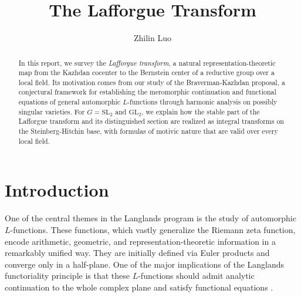 \documentclass[iccmp]{ipbook}
\title[
The Lafforgue Transform]{The Lafforgue Transform}
\author{Zhilin Luo}
\newcommand{\GL}{{\mathrm{GL}}}
\newcommand{\SL}{{\mathrm{SL}}}
\begin{document}
\begin{abstract}
In this report, we survey the \emph{Lafforgue transform}, a natural representation-theoretic map from the Kazhdan cocenter to the Bernstein center of a reductive group over a local field. Its motivation comes from our study of the Braverman-Kazhdan proposal, a conjectural framework for establishing the meromorphic continuation and functional equations of general automorphic $L$-functions through harmonic analysis on possibly singular varieties. For $G=\SL_2$ and $\GL_2$, we explain how the stable part of the Lafforgue transform and its distinguished section are realized as integral transforms on the Steinberg-Hitchin base, with formulas of motivic nature that are valid over every local field.
\end{abstract}

\maketitle


\tableofcontents


\section*{Introduction}\label{sec:intro}

One of the central themes in the Langlands program is the study of automorphic 
$L$-functions. These functions, which vastly generalize the Riemann zeta function,
encode arithmetic, geometric, and representation-theoretic information in a 
remarkably unified way. They are initially defined via Euler products and converge
only in a half-plane. One of the major implications of the Langlands functoriality
principle is that these $L$-functions should admit analytic continuation to the 
whole complex plane and satisfy functional equations \cite{langlandsproblems}.
\end{document}
